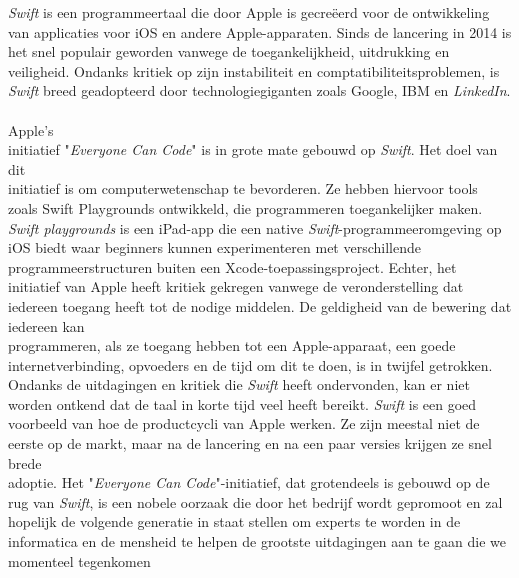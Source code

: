 \textit{Swift} is een programmeertaal die door Apple is gecreëerd voor de ontwikkeling van applicaties voor iOS en andere Apple-apparaten. Sinds de lancering in 2014 is het snel populair geworden vanwege de toegankelijkheid, uitdrukking en veiligheid. Ondanks kritiek op zijn instabiliteit en comptatibiliteitsproblemen, is \textit{Swift} breed geadopteerd door technologiegiganten zoals Google, IBM en \textit{LinkedIn}. \\ \\
Apple's \\initiatief "\textit{Everyone Can Code}" is in grote mate gebouwd op \textit{Swift}. Het doel van dit \\initiatief is om computerwetenschap te bevorderen. Ze hebben hiervoor tools zoals Swift Playgrounds ontwikkeld, die programmeren toegankelijker maken. \textit{Swift playgrounds} is een iPad-app die een native \textit{Swift}-programmeeromgeving op iOS biedt waar beginners kunnen experimenteren met verschillende programmeerstructuren buiten een Xcode-toepassingsproject.
Echter, het initiatief van Apple heeft kritiek gekregen vanwege de veronderstelling dat iedereen toegang heeft tot de nodige middelen. De geldigheid van de bewering dat iedereen kan \\programmeren, als ze toegang hebben tot een Apple-apparaat, een goede \\internetverbinding, opvoeders en de tijd om dit te doen, is in twijfel getrokken.  \\
Ondanks de uitdagingen en kritiek die \textit{Swift} heeft ondervonden, kan er niet  \\worden ontkend dat de taal in korte tijd veel heeft bereikt. \textit{Swift} is een goed voorbeeld van hoe de productcycli van Apple werken. Ze zijn meestal niet de eerste op de markt, maar na de lancering en na een paar versies krijgen ze snel brede  \\adoptie. Het "\textit{Everyone Can Code}"-initiatief, dat grotendeels is gebouwd op de rug van \textit{Swift}, is een nobele oorzaak die door het bedrijf wordt gepromoot en zal  \\hopelijk de volgende generatie in staat stellen om experts te worden in de \\informatica en de mensheid te helpen de grootste uitdagingen aan te gaan die we momenteel tegenkomen \autocite{Weninger2020}  \\

